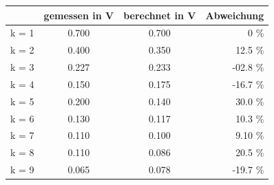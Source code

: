 \begin{figure}[h!]
	\centering
	\begin{tabular}{c|ccr}
		& gemessen in V & berechnet in V & Abweichung \\
		\hline
		 k = 1 & 0.700   & 0.700       &  0  \%       \\
		 k = 2 & 0.400   & 0.350      &  12.5 \%     \\
		 k = 3 & 0.227 & 0.233  & -02.8 \% \\
		 k = 4 & 0.150  & 0.175     & -16.7 \%  \\
		 k = 5 & 0.200   & 0.140      &  30.0 \%      \\
		 k = 6 & 0.130  & 0.117  &  10.3 \%  \\
		 k = 7 & 0.110  & 0.100       &  9.10 \% \\
		 k = 8 & 0.110  & 0.086    &  20.5 \%  \\
		 k = 9 & 0.065 & 0.078 & -19.7 \%  \\
	\end{tabular}
	\label{tab:Saege}
\end{figure}
\clearpage
